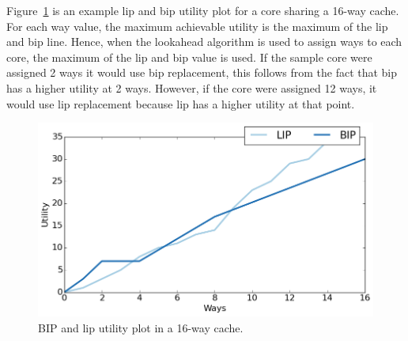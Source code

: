 Figure~\ref{fig:algorithms:clu_example} is an example \gls{lip} and \gls{bip} utility plot for a core sharing a 16-way cache.
For each way value, the maximum achievable utility is the maximum of the \gls{lip} and \gls{bip} line.
Hence, when the lookahead algorithm is used to assign ways to each core, the maximum of the \gls{lip} and \gls{bip} value is used.
If the sample core were assigned 2 ways it would use \gls{bip} replacement, this follows from the fact that \gls{bip} has a higher utility at 2 ways.
However, if the core were assigned 12 ways, it would use \gls{lip} replacement because \gls{lip} has a higher utility at that point.

\begin{figure}[ht]
    \centering
    \includegraphics[width=.65\textwidth]{figures/algorithms/clu-utility}
    \caption{BIP and \gls{lip} utility plot in a 16-way cache.}
    \label{fig:algorithms:clu_example}
\end{figure}
